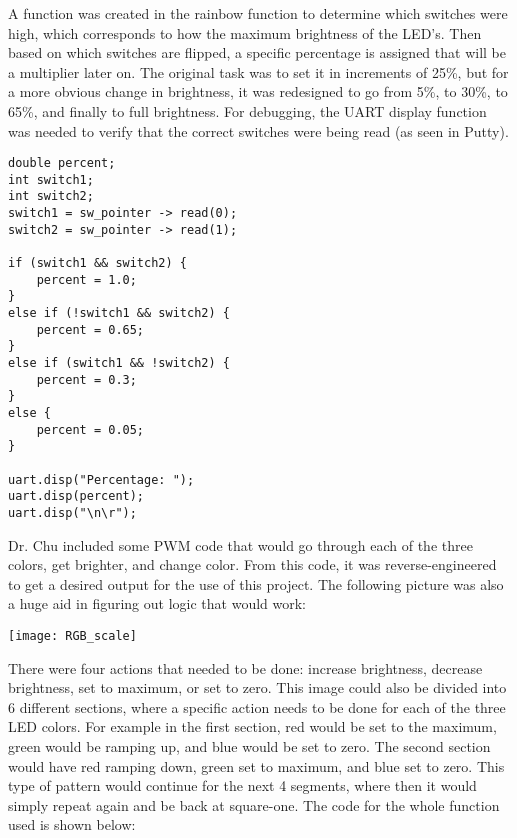 \documentclass[11pt]{article}
\begin{document}
\quad A function was created in the rainbow function to determine which switches were high, which corresponds to how the maximum brightness of the LED's. Then based on which switches are flipped, a specific percentage is assigned that will be a multiplier later on. The original task was to set it in increments of 25\%, but for a more obvious change in brightness, it was redesigned to go from 5\%, to 30\%, to 65\%, and finally to full brightness. For debugging, the UART display function was needed to verify that the correct switches were being read (as seen in Putty).

\begin{lstlisting}[style=CStyle, caption = Switch Function]
double percent;
int switch1;
int switch2;
switch1 = sw_pointer -> read(0);
switch2 = sw_pointer -> read(1);

if (switch1 && switch2) {
	percent = 1.0;
}
else if (!switch1 && switch2) {
	percent = 0.65;
}
else if (switch1 && !switch2) {
	percent = 0.3;
}
else {
	percent = 0.05;
}

uart.disp("Percentage: ");
uart.disp(percent);
uart.disp("\n\r");
\end{lstlisting}

\quad Dr. Chu included some PWM code that would go through each of the three colors, get brighter, and change color. From this code, it was reverse-engineered to get a desired output for the use of this project. The following picture was also a huge aid in figuring out logic that would work: 

\texttt{[image: RGB\_scale]}

\quad There were four actions that needed to be done: increase brightness, decrease brightness, set to maximum, or set to zero. This image could also be divided into 6 different sections, where a specific action needs to be done for each of the three LED colors. For example in the first section, red would be set to the maximum, green would be ramping up, and blue would be set to zero. The second section would have red ramping down, green set to maximum, and blue set to zero. This type of pattern would continue for the next 4 segments, where then it would simply repeat again and be back at square-one. The code for the whole function used is shown below: 
\end{document}
